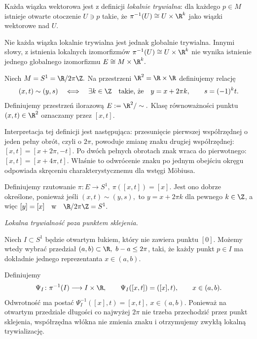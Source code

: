 \begin{uwaga}
Każda wiązka wektorowa jest z definicji \emph{lokalnie trywialna}:
dla każdego $p\in M$ istnieje otwarte otoczenie $U\ni p$ takie, że
$
\pi^{-1}(U)\cong U\times\R^k
$
jako wiązki wektorowe nad $U$.

Nie każda wiązka lokalnie trywialna jest jednak globalnie trywialna.
Innymi słowy, z istnienia lokalnych izomorfizmów
$
\pi^{-1}(U)\cong U\times\R^k
$
nie wynika istnienie jednego globalnego izomorfizmu
$
E\cong M\times\R^k.
$
\end{uwaga}
\begin{przyklad}
\label{prz:mobius}

Niech
$
M=S^1=\R/2\pi\Z.
$
Na przestrzeni $\R^2=\R\times\R$ definiujemy relację
\[
(x,t)\sim(y,s)
\quad\Longleftrightarrow\quad
\exists k\in\Z
\quad\text{takie, że}\quad
y=x+2\pi k,\qquad s=(-1)^k t.
\]
Definiujemy przestrzeń ilorazową
$
E:=\R^2/\sim.
$
Klasę równoważności punktu $(x,t)\in\R^2$ oznaczamy przez
$
[x,t].
$

Interpretacja tej definicji jest następująca:
przesunięcie pierwszej współrzędnej o jeden pełny obrót, czyli o $2\pi$,
powoduje zmianę znaku drugiej współrzędnej:
$
[x,t]=[x+2\pi,-t].
$
Po dwóch pełnych obrotach znak wraca do pierwotnego:
$
[x,t]=[x+4\pi,t].
$
Właśnie to odwrócenie znaku po jednym obejściu okręgu odpowiada
skręceniu charakterystycznemu dla wstęgi Möbiusa.

Definiujemy rzutowanie $\pi\colon E\longrightarrow S^1, \ \pi([x,t])=[x]$.
Jest ono dobrze określone, ponieważ jeśli
$
(x,t)\sim(y,s),
$
to
$
y=x+2\pi k
$
dla pewnego $k\in\Z$, a więc
$
[y]=[x]
\quad\text{w}\quad
\R/2\pi\Z=S^1.
$

\medskip
\emph{Lokalna trywialność poza punktem sklejenia.}

Niech $I\subset S^1$ będzie otwartym łukiem, który nie zawiera punktu $[0]$.
Możemy wtedy wybrać przedział $(a,b)\subset\R, \ b-a\leq2\pi$,
taki, że każdy punkt $p\in I$ ma dokładnie jednego reprezentanta
$x\in(a,b)$.

Definiujemy
\[
\Psi_I\colon \pi^{-1}(I)\longrightarrow I\times\R,
\qquad
\Psi_I([x,t])=([x],t),
\qquad x\in(a,b).
\]
Odwrotność ma postać $\Psi_I^{-1}([x],t)=[x,t], \ x\in(a,b)$.
Ponieważ na otwartym przedziale długości co najwyżej $2\pi$
nie trzeba przechodzić
przez punkt sklejenia, współrzędna włókna nie zmienia znaku i otrzymujemy
zwykłą lokalną trywializację.


\end{przyklad}
